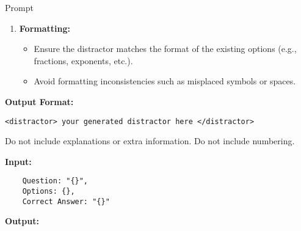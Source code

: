 \begin{methodbox}{Prompt}
\begin{enumerate}
    \item \textbf{Formatting:}
    \begin{itemize}
        \item Ensure the distractor matches the format of the existing options (e.g., fractions, exponents, etc.).
        \item Avoid formatting inconsistencies such as misplaced symbols or spaces.
    \end{itemize}
\end{enumerate}

\vspace{0.5em}  
\textbf{Output Format:}
\begin{verbatim}
<distractor> your generated distractor here </distractor>
\end{verbatim}
\noindent Do not include explanations or extra information.  
\noindent Do not include numbering.

\vspace{0.5em}  
\textbf{Input:}
\begin{verbatim}
    Question: "{}",
    Options: {},
    Correct Answer: "{}"
\end{verbatim}
\noindent \textbf{Output:}
\end{methodbox}